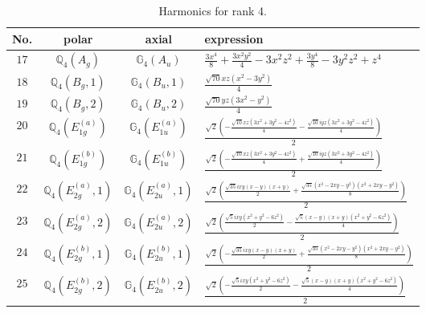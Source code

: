 \documentclass[fleqn,8pt,landscape]{jsarticle}
\begin{document}
\begin{table}[ht!]
\begin{center}
\caption{Harmonics for rank 4.}
\renewcommand{\arraystretch}{1.3}
\begin{tabular}{cccl} \hline \hline
No. & polar & axial & expression \\ \hline
$ 17 $ & $ \mathbb{Q}_{4}(A_{g}) $ & $ \mathbb{G}_{4}(A_{u}) $ & $ \frac{3 x^{4}}{8} + \frac{3 x^{2} y^{2}}{4} - 3 x^{2} z^{2} + \frac{3 y^{4}}{8} - 3 y^{2} z^{2} + z^{4} $ \\
$ 18 $ & $ \mathbb{Q}_{4}(B_{g},1) $ & $ \mathbb{G}_{4}(B_{u},1) $ & $ \frac{\sqrt{70} x z \left(x^{2} - 3 y^{2}\right)}{4} $ \\
$ 19 $ & $ \mathbb{Q}_{4}(B_{g},2) $ & $ \mathbb{G}_{4}(B_{u},2) $ & $ \frac{\sqrt{70} y z \left(3 x^{2} - y^{2}\right)}{4} $ \\
$ 20 $ & $ \mathbb{Q}_{4}(E_{1g}^{(a)}) $ & $ \mathbb{G}_{4}(E_{1u}^{(a)}) $ & $ \frac{\sqrt{2} \left(- \frac{\sqrt{10} x z \left(3 x^{2} + 3 y^{2} - 4 z^{2}\right)}{4} - \frac{\sqrt{10} i y z \left(3 x^{2} + 3 y^{2} - 4 z^{2}\right)}{4}\right)}{2} $ \\
$ 21 $ & $ \mathbb{Q}_{4}(E_{1g}^{(b)}) $ & $ \mathbb{G}_{4}(E_{1u}^{(b)}) $ & $ \frac{\sqrt{2} \left(- \frac{\sqrt{10} x z \left(3 x^{2} + 3 y^{2} - 4 z^{2}\right)}{4} + \frac{\sqrt{10} i y z \left(3 x^{2} + 3 y^{2} - 4 z^{2}\right)}{4}\right)}{2} $ \\
$ 22 $ & $ \mathbb{Q}_{4}(E_{2g}^{(a)},1) $ & $ \mathbb{G}_{4}(E_{2u}^{(a)},1) $ & $ \frac{\sqrt{2} \left(\frac{\sqrt{35} i x y \left(x - y\right) \left(x + y\right)}{2} + \frac{\sqrt{35} \left(x^{2} - 2 x y - y^{2}\right) \left(x^{2} + 2 x y - y^{2}\right)}{8}\right)}{2} $ \\
$ 23 $ & $ \mathbb{Q}_{4}(E_{2g}^{(a)},2) $ & $ \mathbb{G}_{4}(E_{2u}^{(a)},2) $ & $ \frac{\sqrt{2} \left(\frac{\sqrt{5} i x y \left(x^{2} + y^{2} - 6 z^{2}\right)}{2} - \frac{\sqrt{5} \left(x - y\right) \left(x + y\right) \left(x^{2} + y^{2} - 6 z^{2}\right)}{4}\right)}{2} $ \\
$ 24 $ & $ \mathbb{Q}_{4}(E_{2g}^{(b)},1) $ & $ \mathbb{G}_{4}(E_{2u}^{(b)},1) $ & $ \frac{\sqrt{2} \left(- \frac{\sqrt{35} i x y \left(x - y\right) \left(x + y\right)}{2} + \frac{\sqrt{35} \left(x^{2} - 2 x y - y^{2}\right) \left(x^{2} + 2 x y - y^{2}\right)}{8}\right)}{2} $ \\
$ 25 $ & $ \mathbb{Q}_{4}(E_{2g}^{(b)},2) $ & $ \mathbb{G}_{4}(E_{2u}^{(b)},2) $ & $ \frac{\sqrt{2} \left(- \frac{\sqrt{5} i x y \left(x^{2} + y^{2} - 6 z^{2}\right)}{2} - \frac{\sqrt{5} \left(x - y\right) \left(x + y\right) \left(x^{2} + y^{2} - 6 z^{2}\right)}{4}\right)}{2} $ \\
 \hline \hline
\end{tabular}
\end{center}
\end{table}
\end{document}
